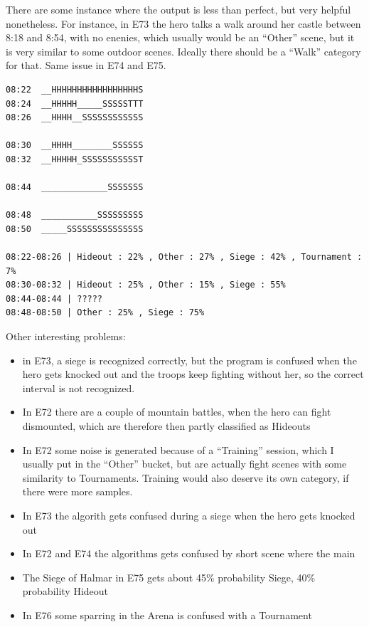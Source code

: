 \documentclass[
]{article}
\providecommand{\tightlist}{%
  \setlength{\itemsep}{0pt}\setlength{\parskip}{0pt}}
\begin{document}
There are some instance where the output is less than perfect, but very
helpful nonetheless. For instance, in E73 the hero talks a walk around
her castle between 8:18 and 8:54, with no enenies, which usually would
be an ``Other'' scene, but it is very similar to some outdoor scenes.
Ideally there should be a ``Walk'' category for that. Same issue in E74
and E75.

\begin{verbatim}
08:22  __HHHHHHHHHHHHHHHHHS
08:24  __HHHHH_____SSSSSTTT
08:26  __HHHH__SSSSSSSSSSSS

08:30  __HHHH________SSSSSS
08:32  __HHHHH_SSSSSSSSSSST

08:44  _____________SSSSSSS

08:48  ___________SSSSSSSSS
08:50  _____SSSSSSSSSSSSSSS

08:22-08:26 | Hideout : 22% , Other : 27% , Siege : 42% , Tournament : 7%
08:30-08:32 | Hideout : 25% , Other : 15% , Siege : 55%
08:44-08:44 | ?????
08:48-08:50 | Other : 25% , Siege : 75%
\end{verbatim}

Other interesting problems:

\begin{itemize}
	\tightlist
	\item
	in E73, a siege is recognized correctly, but the program is confused
	when the hero gets knocked out and the troops keep fighting without
	her, so the correct interval is not recognized.
	\item
	In E72 there are a couple of mountain battles, when the hero can fight
	dismounted, which are therefore then partly classified as Hideouts
	\item
	In E72 some noise is generated because of a ``Training'' session,
	which I usually put in the ``Other'' bucket, but are actually fight
	scenes with some similarity to Tournaments. Training would also
	deserve its own category, if there were more samples.
	\item
	In E73 the algorith gets confused during a siege when the hero gets
	knocked out
	\item
	In E72 and E74 the algorithms gets confused by short scene where the
	main\\
	\item
	The Siege of Halmar in E75 gets about 45\% probability Siege, 40\%
	probability Hideout
	\item
	In E76 some sparring in the Arena is confused with a Tournament
\end{itemize}
\end{document}
